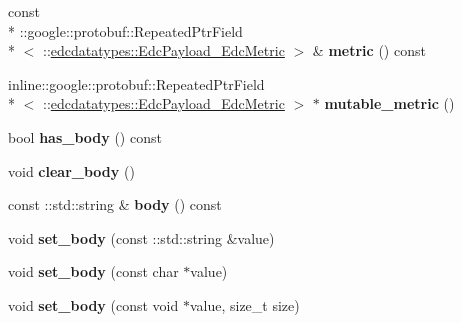 \begin{DoxyCompactItemize}
\item 
\hypertarget{classedcdatatypes_1_1_edc_payload_af8cfbb0e0be4fd9d7a41a752aa8200ed}{const \\*
\-::google\-::protobuf\-::\-Repeated\-Ptr\-Field\\*
$<$ \-::\hyperlink{classedcdatatypes_1_1_edc_payload___edc_metric}{edcdatatypes\-::\-Edc\-Payload\-\_\-\-Edc\-Metric} $>$ \& {\bfseries metric} () const }\label{classedcdatatypes_1_1_edc_payload_af8cfbb0e0be4fd9d7a41a752aa8200ed}

\item 
\hypertarget{classedcdatatypes_1_1_edc_payload_a75085f75337333257b263e1e379cd993}{inline\-::google\-::protobuf\-::\-Repeated\-Ptr\-Field\\*
$<$ \-::\hyperlink{classedcdatatypes_1_1_edc_payload___edc_metric}{edcdatatypes\-::\-Edc\-Payload\-\_\-\-Edc\-Metric} $>$ $\ast$ {\bfseries mutable\-\_\-metric} ()}\label{classedcdatatypes_1_1_edc_payload_a75085f75337333257b263e1e379cd993}

\item 
\hypertarget{classedcdatatypes_1_1_edc_payload_aff6bf29aaacb62891b67e72b2069950e}{bool {\bfseries has\-\_\-body} () const }\label{classedcdatatypes_1_1_edc_payload_aff6bf29aaacb62891b67e72b2069950e}

\item 
\hypertarget{classedcdatatypes_1_1_edc_payload_a96d99c78480468c4e0e42cb80e2db8e3}{void {\bfseries clear\-\_\-body} ()}\label{classedcdatatypes_1_1_edc_payload_a96d99c78480468c4e0e42cb80e2db8e3}

\item 
\hypertarget{classedcdatatypes_1_1_edc_payload_ab61e19c30e44e3a098d6656f6dabb381}{const \-::std\-::string \& {\bfseries body} () const }\label{classedcdatatypes_1_1_edc_payload_ab61e19c30e44e3a098d6656f6dabb381}

\item 
\hypertarget{classedcdatatypes_1_1_edc_payload_a598e40c8097b0b7525e5680a25b9d94f}{void {\bfseries set\-\_\-body} (const \-::std\-::string \&value)}\label{classedcdatatypes_1_1_edc_payload_a598e40c8097b0b7525e5680a25b9d94f}

\item 
\hypertarget{classedcdatatypes_1_1_edc_payload_ac48103506cf126a271b590d2c1fa5b52}{void {\bfseries set\-\_\-body} (const char $\ast$value)}\label{classedcdatatypes_1_1_edc_payload_ac48103506cf126a271b590d2c1fa5b52}

\item 
\hypertarget{classedcdatatypes_1_1_edc_payload_aea7029d0ad1e4f8d56476a15a975cae3}{void {\bfseries set\-\_\-body} (const void $\ast$value, size\-\_\-t size)}\label{classedcdatatypes_1_1_edc_payload_aea7029d0ad1e4f8d56476a15a975cae3}


\end{DoxyCompactItemize}
